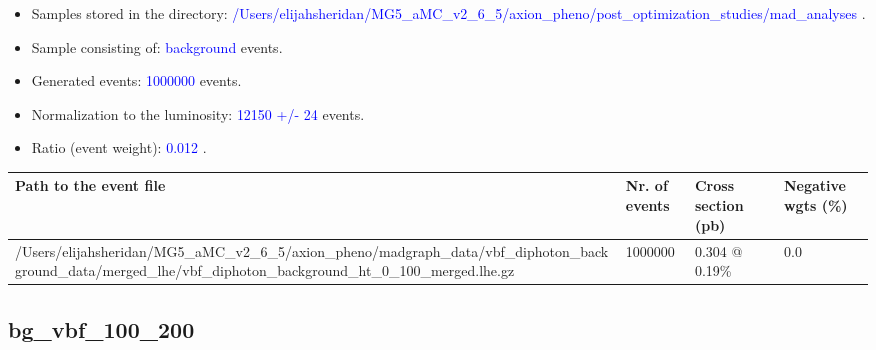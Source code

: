 \documentclass[a4paper, 10pt]{article}
\begin{document}
\begin{itemize}
  \item Samples stored in the directory: \textcolor{blue}{/\-Users/\-elijahsheridan/\-MG5\_aMC\_v2\_6\_5/\-axion\_pheno/\-post\_optimization\_studies/\-mad\_analyses} .
   \item Sample consisting of: \textcolor{blue}{background}  events.
   \item Generated events: \textcolor{blue}{1000000 }  events.
   \item Normalization to the luminosity: \textcolor{blue}{12150}\textcolor{blue}{ +/\-- }\textcolor{blue}{24 }  events.
   \item Ratio (event weight): \textcolor{blue}{0.012 } .  
 
\end{itemize}
\begin{table}[H]
  \begin{center}
    \begin{tabular}{|m{55.0mm}|m{25.0mm}|m{30.0mm}|m{30.0mm}|}
      \hline
      {\cellcolor{yellow}         Path to the event file}& {\cellcolor{yellow}         Nr. of events}& {\cellcolor{yellow}         Cross section (pb)}& {\cellcolor{yellow}         Negative wgts (\%)}\\
      \hline
      {\cellcolor{white}          /\-Users/\-elijahsheridan/\-MG5\_aMC\_v2\_6\_5/\-axion\_pheno/\-madgraph\_data/\-vbf\_diphoton\_background\_data/\-merged\_lhe/\-vbf\_diphoton\_background\_ht\_0\_100\_merged.lhe.gz}& {\cellcolor{white}          1000000}& {\cellcolor{white}          0.304 @ 0.19\%}& {\cellcolor{white}          0.0}\\
\hline
    \end{tabular}
  \end{center}
\end{table}

\subsection{ bg\_vbf\_100\_200}
\end{document}
